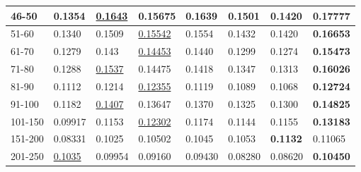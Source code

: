 \begin{table*}[]
\begin{tabular}{|l|l|l|l|l|l|l||l|}
        46-50       & 0.1354                         & \underline{0.1643}             & 0.15675                        & 0.1639                         & 0.1501                         & 0.1420                          & \textbf{0.17777}           \\ \hline
        51-60       & 0.1340                         & 0.1509                         & \underline{0.15542}            & 0.1554                         & 0.1432                         & 0.1420                          & \textbf{0.16653}           \\ \hline
        61-70       & 0.1279                         & 0.143                          & \underline{0.14453}            & 0.1440                         & 0.1299                         & 0.1274                          & \textbf{0.15473}           \\ \hline
        71-80       & 0.1288                         & \underline{0.1537}             & 0.14475                        & 0.1418                         & 0.1347                         & 0.1313                          & \textbf{0.16026}           \\ \hline
        81-90       & 0.1112                         & 0.1214                         & \underline{0.12355}            & 0.1119                         & 0.1089                         & 0.1068                          & \textbf{0.12724}           \\ \hline
        91-100      & 0.1182                         & \underline{0.1407}             & 0.13647                        & 0.1370                         & 0.1325                         & 0.1300                          & \textbf{0.14825}           \\ \hline
        101-150     & 0.09917                        & 0.1153                         & \underline{0.12302}            & 0.1174                         & 0.1144                         & 0.1155                          & \textbf{0.13183}           \\ \hline
        151-200     & 0.08331                        & 0.1025                         & 0.10502                        & 0.1045                         & 0.1053                         & \textbf{0.1132}                 & 0.11065                    \\ \hline
        201-250     & \underline{0.1035}             & 0.09954                        & 0.09160                        & 0.09430                        & 0.08280                        & 0.08620                         & \textbf{0.10450}           \\ \hline

\end{tabular}
\end{table*}

